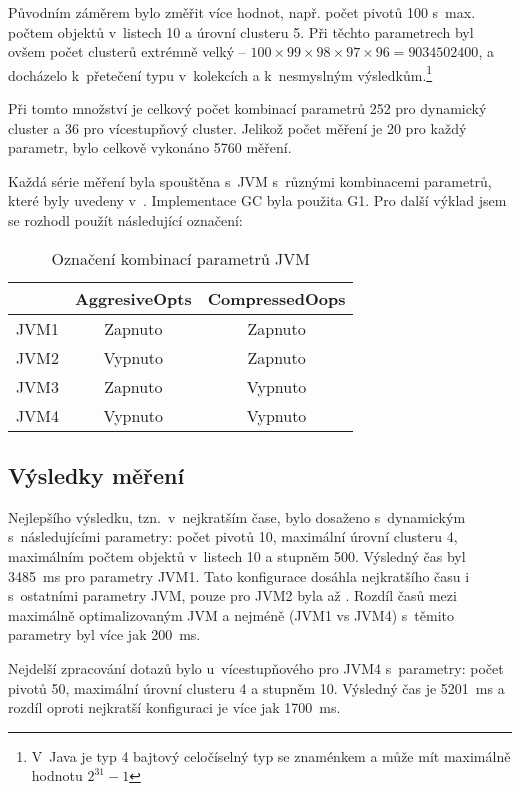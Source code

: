 Původním záměrem bylo změřit více hodnot, např. počet pivotů \num{100} s~max. počtem objektů v~listech \num{10} a úrovní clusteru \num{5}.
Při těchto parametrech byl ovšem počet clusterů extrémně velký -- $100 \times 99 \times 98 \times 97 \times 96 = \num{9034502400}$, a docházelo k~přetečení typu  v~kolekcích a k~nesmyslným výsledkům.\footnote{V~Java je typ  4 bajtový celočíselný typ se znaménkem a může mít maximálně hodnotu $2^{31}-1$}

Při tomto množství je celkový počet kombinací parametrů \num{252} pro dynamický cluster a \num{36} pro vícestupňový cluster.
Jelikož počet měření je \num{20} pro každý parametr, bylo celkově vykonáno \num{5760} měření.

Každá série měření byla spouštěna s~JVM s~různými kombinacemi parametrů, které byly uvedeny v~.
Implementace GC byla použita G1.
Pro další výklad jsem se rozhodl použít následující označení:

\begin{table}[h]
\center
\begin{tabular}{|l  || c | c |}
\hline
& AggresiveOpts & CompressedOops \\ \hline
\hline
JVM1 & Zapnuto & Zapnuto \\ \hline
JVM2 & Vypnuto & Zapnuto \\ \hline
JVM3 & Zapnuto & Vypnuto \\ \hline
JVM4 & Vypnuto & Vypnuto \\ \hline
\end{tabular}
\caption{Označení kombinací parametrů JVM}
\end{table}

\subsection{Výsledky měření}
Nejlepšího výsledku, tzn.~v~nejkratším čase, bylo dosaženo s~dynamickým  s~následujícími parametry: počet pivotů \num{10}, maximální úrovní clusteru \num{4}, maximálním počtem objektů v~listech \num{10} a stupněm \BPTree{} \num{500}.
Výsledný čas byl \SI{3485}{\ms} pro parametry JVM1.
Tato konfigurace dosáhla nejkratšího času i s~ostatními parametry JVM, pouze pro JVM2 byla až .
Rozdíl časů mezi maximálně optimalizovaným JVM a nejméně (JVM1 vs JVM4) s~těmito parametry byl více jak \SI{200}{\ms}.

Nejdelší zpracování dotazů bylo u~vícestupňového  pro JVM4 s~parametry: počet pivotů \num{50}, maximální úrovní clusteru \num{4} a stupněm \BPTree{} \num{10}.
Výsledný čas je \SI{5201}{\ms} a rozdíl oproti nejkratší konfiguraci je více jak \SI{1700}{\ms}.

